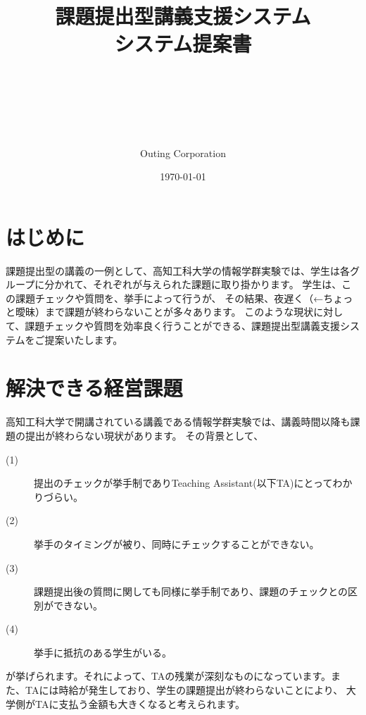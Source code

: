 \documentclass[a4j,titlepage]{ujarticle}
\title{
{課題提出型講義支援システム
\\
システム提案書}
\author{\\
\\
\\
\\
\\
Outing Corporation}
\date{\today}
}
\begin{document}
\maketitle


\tableofcontents



\clearpage


\section{はじめに}
課題提出型の講義の一例として、高知工科大学の情報学群実験では、学生は各グループに分かれて、それぞれが与えられた課題に取り掛かります。
学生は、この課題チェックや質問を、挙手によって行うが、%
その結果、夜遅く（←ちょっと曖昧）まで課題が終わらないことが多々あります。
このような現状に対して、課題チェックや質問を効率良く行うことができる、課題提出型講義支援システムをご提案いたします。


\section{解決できる経営課題}
高知工科大学で開講されている講義である情報学群実験では、講義時間以降も課題の提出が終わらない現状があります。 %
その背景として、
\begin{description}
\item[(1)]提出のチェックが挙手制でありTeaching Assistant(以下TA)にとってわかりづらい。
\item[(2)]挙手のタイミングが被り、同時にチェックすることができない。
\item[(3)]課題提出後の質問に関しても同様に挙手制であり、課題のチェックとの区別ができない。
\item[(4)]挙手に抵抗のある学生がいる。
\end{description}
が挙げられます。それによって、TAの残業が深刻なものになっています。また、TAには時給が発生しており、学生の課題提出が終わらないことにより、
大学側がTAに支払う金額も大きくなると考えられます。



\end{document}
